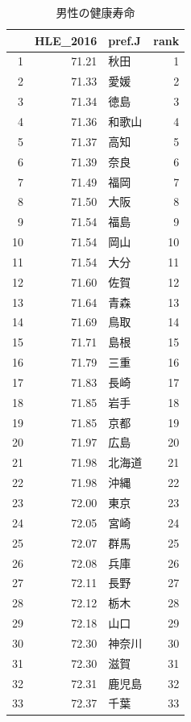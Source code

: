 \begin{table}[ht]
\centering
\footnotesize
\caption{男性の健康寿命}
\begin{tabular}{rrlr}
  \hline
 & HLE\_2016 & pref.J & rank \\
  \hline
1 & 71.21 & 秋田 &   1 \\
  2 & 71.33 & 愛媛 &   2 \\
  3 & 71.34 & 徳島 &   3 \\
  4 & 71.36 & 和歌山 &   4 \\
  5 & 71.37 & 高知 &   5 \\
  6 & 71.39 & 奈良 &   6 \\
  7 & 71.49 & 福岡 &   7 \\
  8 & 71.50 & 大阪 &   8 \\
  9 & 71.54 & 福島 &   9 \\
  10 & 71.54 & 岡山 &  10 \\
  11 & 71.54 & 大分 &  11 \\
  12 & 71.60 & 佐賀 &  12 \\
  13 & 71.64 & 青森 &  13 \\
  14 & 71.69 & 鳥取 &  14 \\
  15 & 71.71 & 島根 &  15 \\
  16 & 71.79 & 三重 &  16 \\
  17 & 71.83 & 長崎 &  17 \\
  18 & 71.85 & 岩手 &  18 \\
  19 & 71.85 & 京都 &  19 \\
  20 & 71.97 & 広島 &  20 \\
  21 & 71.98 & 北海道 &  21 \\
  22 & 71.98 & 沖縄 &  22 \\
  23 & 72.00 & 東京 &  23 \\
  24 & 72.05 & 宮崎 &  24 \\
  25 & 72.07 & 群馬 &  25 \\
  26 & 72.08 & 兵庫 &  26 \\
  27 & 72.11 & 長野 &  27 \\
  28 & 72.12 & 栃木 &  28 \\
  29 & 72.18 & 山口 &  29 \\
  30 & 72.30 & 神奈川 &  30 \\
  31 & 72.30 & 滋賀 &  31 \\
  32 & 72.31 & 鹿児島 &  32 \\
  33 & 72.37 & 千葉 &  33 \\

\end{tabular}
\end{table}
